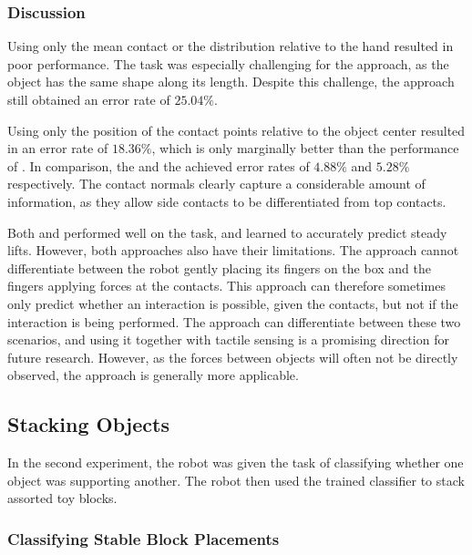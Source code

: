 \subsubsection*{Discussion}

Using only the mean contact or the distribution relative to the hand
resulted in poor performance. The task was especially challenging
for the  approach, as the object has the same shape
along its length. Despite this challenge, the approach still obtained
an error rate of $25.04\%$.

Using only the position of the contact points relative to the object
center resulted in an error rate of $18.36\%$, which is only marginally
better than the performance of . In comparison,
the  and the  achieved error rates
of $4.88\%$ and $5.28\%$ respectively. The contact normals clearly
capture a considerable amount of information, as they allow side contacts
to be differentiated from top contacts. 

Both and  performed well on the
task, and learned to accurately predict steady lifts. However, both
approaches also have their limitations. The  approach
cannot differentiate between the robot gently placing its fingers
on the box and the fingers applying forces at the contacts. This approach
can therefore sometimes only predict whether an interaction is possible,
given the contacts, but not if the interaction is being performed.
The approach can differentiate between these two
scenarios, and using it together with tactile sensing is a promising
direction for future research. However, as the forces between objects
will often not be directly observed, the  approach
is generally more applicable. 


\subsection{Stacking Objects}

In the second experiment, the robot was given the task of classifying
whether one object was supporting another. The robot then used the
trained classifier to stack assorted toy blocks.


\subsubsection*{Classifying Stable Block Placements\label{sub:stackingexperiment}}

